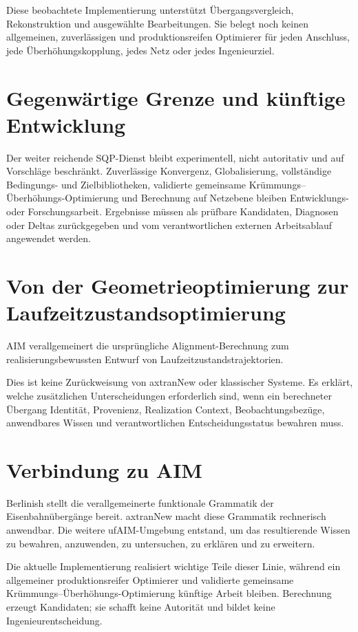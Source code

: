 Diese beobachtete Implementierung unterstützt Übergangsvergleich,
Rekonstruktion und ausgewählte Bearbeitungen. Sie belegt noch keinen
allgemeinen, zuverlässigen und produktionsreifen Optimierer für jeden
Anschluss, jede Überhöhungskopplung, jedes Netz oder jedes Ingenieurziel.

\section{Gegenwärtige Grenze und künftige Entwicklung}

Der weiter reichende SQP-Dienst bleibt experimentell, nicht autoritativ und
auf Vorschläge beschränkt. Zuverlässige Konvergenz, Globalisierung,
vollständige Bedingungs- und Zielbibliotheken, validierte gemeinsame
Krümmungs--Überhöhungs-Optimierung und Berechnung auf Netzebene bleiben
Entwicklungs- oder Forschungsarbeit. Ergebnisse müssen als prüfbare
Kandidaten, Diagnosen oder Deltas zurückgegeben und vom verantwortlichen
externen Arbeitsablauf angewendet werden.

\section{Von der Geometrieoptimierung zur Laufzeitzustandsoptimierung}

AIM verallgemeinert die ursprüngliche Alignment-Berechnung zum
realisierungsbewussten Entwurf von Laufzeitzustandstrajektorien.

Dies ist keine Zurückweisung von axtranNew oder klassischer Systeme. Es erklärt,
welche zusätzlichen Unterscheidungen erforderlich sind, wenn ein berechneter
Übergang Identität, Provenienz, Realization Context, Beobachtungsbezüge,
anwendbares Wissen und verantwortlichen Entscheidungsstatus bewahren muss.

\section{Verbindung zu AIM}

\begin{summary}
Berlinish stellt die verallgemeinerte funktionale Grammatik der
Eisenbahnübergänge bereit. axtranNew macht diese Grammatik rechnerisch
anwendbar. Die weitere ufAIM-Umgebung entstand, um das resultierende Wissen zu
bewahren, anzuwenden, zu untersuchen, zu erklären und zu erweitern.

Die aktuelle Implementierung realisiert wichtige Teile dieser Linie, während
ein allgemeiner produktionsreifer Optimierer und validierte gemeinsame
Krümmungs--Überhöhungs-Optimierung künftige Arbeit bleiben. Berechnung erzeugt
Kandidaten; sie schafft keine Autorität und bildet keine Ingenieurentscheidung.
\end{summary}
